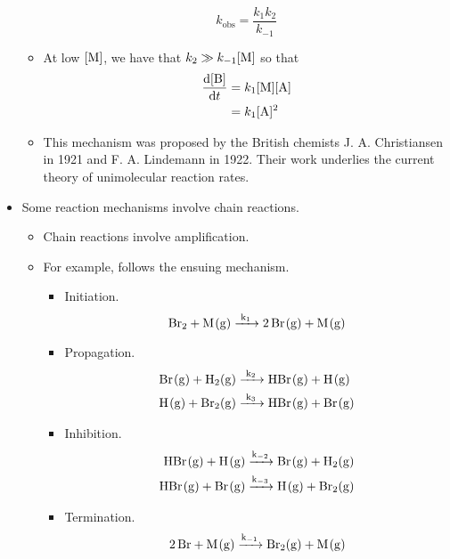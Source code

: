 \documentclass[../notes.tex]{subfiles}
\begin{document}
\begin{itemize}
\begin{itemize}
        \begin{equation*}
            k_\text{obs} = \frac{k_1k_2}{k_{-1}}
        \end{equation*}
        \item At low $[\ce{M}]$, we have that $k_2\gg k_{-1}[\ce{M}]$ so that
        \begin{align*}
            \dv{[\ce{B}]}{t} &= k_1[\ce{M}][\ce{A}]\\
            &= k_1[\ce{A}]^2
        \end{align*}
        \item This mechanism was proposed by the British chemists J. A. Christiansen in 1921 and F. A. Lindemann in 1922. Their work underlies the current theory of unimolecular reaction rates.
    \end{itemize}
    \item Some reaction mechanisms involve chain reactions.
    \begin{itemize}
        \item Chain reactions involve amplification.
        \item For example,  follows the ensuing mechanism.
        \begin{itemize}
            \item Initiation.
            \begin{equation*}
                \ce{Br2 + M(g) ->[k_1] 2Br(g) + M(g)}
            \end{equation*}
            \item Propagation.
            \begin{align*}
                \ce{Br(g) + H2(g)} &\ce{->[k_2]} \ce{HBr(g) + H(g)}\\
                \ce{H(g) + Br2(g)} &\ce{->[k_3]} \ce{HBr(g) + Br(g)}
            \end{align*}
            \item Inhibition.
            \begin{align*}
                \ce{HBr(g) + H(g)} &\ce{->[k_{-2}]} \ce{Br(g) + H2(g)}\\
                \ce{HBr(g) + Br(g)} &\ce{->[k_{-3}]} \ce{H(g) + Br2(g)}
            \end{align*}
            \item Termination.
            \begin{equation*}
                \ce{2Br + M(g) ->[k_{-1}] Br2(g) + M(g)}
            \end{equation*}
        \end{itemize}

\end{itemize}
\end{itemize}
\end{document}
